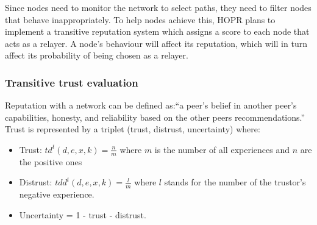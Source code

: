 Since nodes need to monitor the network to select paths, they need to filter
nodes that behave inappropriately. To help nodes achieve this, HOPR plans to implement a
transitive reputation system which assigns a score to each node that acts as a
relayer. A node’s behaviour will affect its reputation, which will in turn affect its probability of
being chosen as a relayer.

\subsubsection*{Transitive trust evaluation }

Reputation with a network can be defined as:``a peer’s belief in another peer’s
capabilities, honesty, and reliability based on the other peers recommendations.”
Trust is represented by a triplet (trust, distrust, uncertainty) where:

\begin{itemize}

    \item Trust: $td^t(d,e,x,k)=\frac{n}{m}$ where $m$ is the number of all
        experiences and $n$ are the positive ones

    \item Distrust: $tdd^t(d,e,x,k)=\frac{l}{m}$ where $l$ stands for the number
        of the trustor’s negative experience.

    \item Uncertainty = 1 - trust - distrust.

\end{itemize}